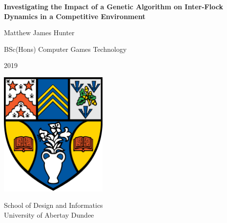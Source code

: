 \documentclass{article}
\begin{document}
\begin{titlepage}
	\begin{center}
       	 	\vspace*{1cm}

        		\Huge
        		\textbf{Investigating the Impact of a Genetic Algorithm on Inter-Flock Dynamics in a Competitive Environment}
 
        		\vspace{1.5cm}
 
        		Matthew James Hunter
 
        		\vfill

        		BSc(Hons) Computer Games Technology

		2019
 
        		\vspace{0.8cm}
 
        		\includegraphics[width=0.4\textwidth]{../Images/Abertay_Coat_Of_Arms}
 
        		\Large
		School of Design and Informatics\\
		University of Abertay Dundee\\
    	\end{center}
\end{titlepage}

\newpage
{}
\doublespacing
	\tableofcontents
	\listoffigures
\newpage

\singlespacing
\newpage
	
\newpage
	
\newpage

	
\newpage
	
\newpage
	
\newpage
	
\newpage
	
\newpage
	
\newpage
	
\newpage

\newpage
	
	
\end{document}
